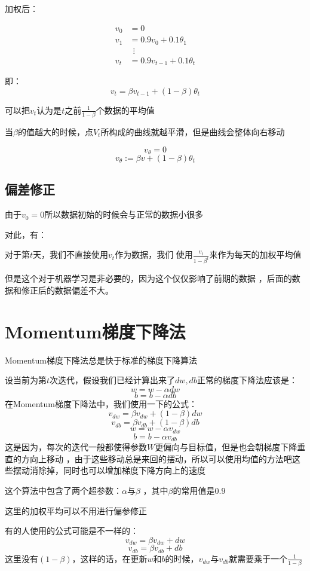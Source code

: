 \documentclass[UTF8]{ctexrep}
\begin{document}
加权后：

    \begin{align*}
        v_0&=0\\
        v_1&=0.9v_0+0.1\theta_1\\
        &\ \ \vdots\\
        v_t&=0.9v_{t-1}+0.1\theta_t
    \end{align*}

即：
$$v_t=\beta v_{t-1}+(1-\beta)\theta_t$$

可以把$v_t$认为是$t$之前$\frac1{1-\beta}$个数据的平均值

当$\beta$的值越大的时候，点$V_t$所构成的曲线就越平滑，但是曲线会整体向右移动

$$v_\theta = 0$$
$$v_\theta := \beta v+(1-\beta)\theta_t$$

\subsection{偏差修正}
由于$v_0=0$所以数据初始的时候会与正常的数据小很多

对此，有：

对于第$t$天，我们不直接使用$v_t$作为数据，我们
使用$\frac{v_t}{1-\beta^t}$来作为每天的加权平均值

但是这个对于机器学习是非必要的，因为这个仅仅影响了前期的数据
，后面的数据和修正后的数据偏差不大。

\section{Momentum梯度下降法}
Momentum梯度下降法总是快于标准的梯度下降算法

设当前为第$t$次迭代，假设我们已经计算出来了$dw,db$正常的梯度下降法应该是：
$$w=w-\alpha dw$$
$$b=b-\alpha db$$
在Momentum梯度下降法中，我们使用一下的公式：
$$v_{dw}=\beta v_{dw}+(1-\beta)dw$$
$$v_{db}=\beta v_{db}+(1-\beta)db$$
$$w=w-\alpha v_{dw}$$
$$b=b-\alpha v_{db}$$
这是因为，每次的迭代一般都使得参数$W$更偏向与目标值，但是也会朝梯度下降垂直的方向上移动
，由于这些移动总是来回的摆动，所以可以使用均值的方法吧这些摆动消除掉，同时也可以增加梯度下降方向上的速度

这个算法中包含了两个超参数：$\alpha$与$\beta$
，其中$\beta$的常用值是$0.9$

这里的加权平均可以不用进行偏参修正

有的人使用的公式可能是不一样的：
$$v_{dw}=\beta v_{dw}+dw$$
$$v_{db}=\beta v_{db}+db$$
这里没有$(1-\beta)$，这样的话，在更新$w$和$b$的时候，$v_{dw}$与$v_{db}$就需要乘于一个$\frac1{1-\beta}$
\end{document}
